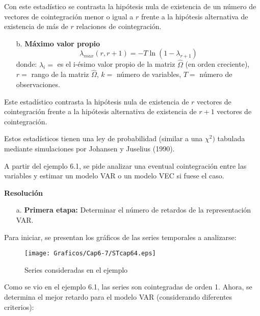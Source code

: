 Con este estad\'{i}stico se contrasta la hip\'{o}tesis nula de existencia de un n\'{u}mero de vectores de cointegraci\'{o}n menor o igual a $r$ frente a la hip\'{o}tesis alternativa de existencia de m\'{a}s de $r$ relaciones de cointegraci\'{o}n.

\begin{enumerate}
\item[b.] {\bf M\'{a}ximo valor propio}
\[
\lambda_{max}(r, r+1)=-T \ln(1-\lambda_{r+1})
\]
donde:\newline
$\lambda_{i}=$ es el i-\'{e}simo valor propio de la matriz $\hat{\Omega}$ (en orden creciente),\newline
$r=$ rango de la matriz $\hat{\Omega }$,\newline
$k=$ n\'{u}mero de variables,\newline
$T=$ n\'{u}mero de observaciones.
\end{enumerate}

Este estad\'{i}stico contrasta la hip\'{o}tesis nula de existencia de $r$ vectores de cointegraci\'{o}n frente a la hip\'{o}tesis alternativa de existencia de $r + 1$ vectores de cointegraci\'{o}n.\newline

Estos estad\'{i}sticos tienen una ley de probabilidad (similar a una $\chi^{2})$ tabulada mediante simulaciones por Johansen y Juselius (1990).

\begin{ejemplo}
A partir del ejemplo 6.1, se pide analizar una eventual cointegraci\'{o}n entre las variables y estimar un modelo VAR o un modelo VEC si fuese el caso.
\end{ejemplo}

\textbf{Resoluci\'{o}n}\newline

\begin{enumerate}
\item[a.] \textbf{Primera etapa:} Determinar el n\'{u}mero de retardos de la representaci\'{o}n VAR.
\end{enumerate}

Para iniciar, se presentan los gr\'{a}ficos de las series temporales a analizarse:

\begin{figure}[H]
\centering
\texttt{[image: Graficos/Cap6-7/STcap64.eps]}
\caption{Series consideradas en el ejemplo}
\label{fig4}
\end{figure}

Como se vio en el ejemplo 6.1, las series son cointegradas de orden 1. Ahora, se determina el mejor retardo para el modelo VAR (considerando diferentes criterios):

